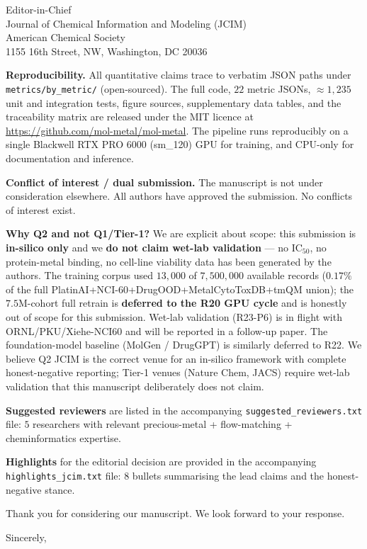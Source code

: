 \documentclass[11pt]{letter}
\begin{document}
\begin{letter}{Editor-in-Chief \\
  Journal of Chemical Information and Modeling (JCIM) \\
  American Chemical Society \\
  1155 16th Street, NW, Washington, DC 20036}
\bigskip

\noindent\textbf{Reproducibility.}  All quantitative claims trace to
verbatim JSON paths under \texttt{metrics/by\_metric/} (open-sourced).
The full code, $22$ metric JSONs, $\approx 1{,}235$ unit and integration
tests, figure sources, supplementary data tables, and the
traceability matrix are released under the MIT licence at
\url{https://github.com/mol-metal/mol-metal}.  The pipeline runs
reproducibly on a single Blackwell RTX PRO 6000 (sm\_120) GPU for
training, and CPU-only for documentation and inference.

\bigskip

\noindent\textbf{Conflict of interest / dual submission.}  The
manuscript is not under consideration elsewhere.  All authors have
approved the submission.  No conflicts of interest exist.

\bigskip

\noindent\textbf{Why Q2 and not Q1/Tier-1?}  We are explicit about
scope: this submission is \textbf{in-silico only} and we
\textbf{do not claim wet-lab validation} --- no IC$_{50}$, no
protein-metal binding, no cell-line viability data has been
generated by the authors.  The training corpus used $13{,}000$ of
$7{,}500{,}000$ available records ($0.17\%$ of the full
PlatinAI+NCI-60+DrugOOD+MetalCytoToxDB+tmQM union); the
$7.5$M-cohort full retrain is \textbf{deferred to the R20 GPU cycle}
and is honestly out of scope for this submission.  Wet-lab
validation (R23-P6) is in flight with ORNL/PKU/Xiehe-NCI60 and will
be reported in a follow-up paper.  The foundation-model baseline
(MolGen / DrugGPT) is similarly deferred to R22.  We believe Q2
JCIM is the correct venue for an in-silico framework with complete
honest-negative reporting; Tier-1 venues (Nature Chem, JACS)
require wet-lab validation that this manuscript deliberately does
not claim.

\bigskip

\noindent\textbf{Suggested reviewers} are listed in the accompanying
\texttt{suggested\_reviewers.txt} file: $5$ researchers with relevant
precious-metal + flow-matching + cheminformatics expertise.

\bigskip

\noindent\textbf{Highlights} for the editorial decision are provided in
the accompanying \texttt{highlights\_jcim.txt} file: $8$ bullets
summarising the lead claims and the honest-negative stance.

\bigskip

Thank you for considering our manuscript.  We look forward to your
response.

\closing{Sincerely,}

\end{letter}
\end{document}
